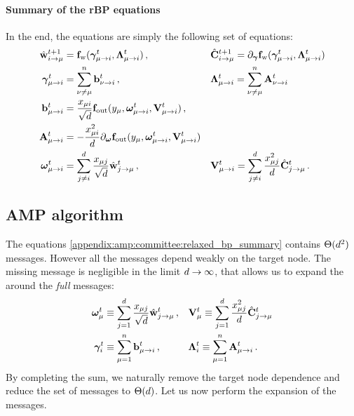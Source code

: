 		\paragraph{Summary of the rBP equations}
			In the end, the  equations are simply the following set of equations:
			\begin{align}
			\label{appendix:amp:committee:relaxed_bp_summary}
			\begin{aligned}
				\hat{{\mathbf{w}}}_{i\to \mu}^{t+1} &= {\mathbf{f}}_{\mathrm{w}}({\boldsymbol{\gamma}}_{\mu \to i}^t,{\boldsymbol{\Lambda}}_{\mu \to i}^t )\,, 
				&&\hat{{\mathbf{C}}}_{i \to \mu}^{t+1} = \partial_{\boldsymbol{\gamma}} {\mathbf{f}}_{\mathrm{w}}({\boldsymbol{\gamma}}_{\mu \to i}^t, {\boldsymbol{\Lambda}}_{\mu \to i}^t)  \\
				{\boldsymbol{\gamma}}_{\mu \to i}^t &=  \sum\limits_{\nu \ne \mu}^n  {\mathbf{b}}_{\nu \to i}^t \,, 
				&& {\boldsymbol{\Lambda}}_{\mu \to i}^t =  \sum\limits_{\nu \ne \mu}^n  {\mathbf{A}}_{\nu \to i}^t   \\
			{\mathbf{b}}_{\mu \to i}^t &=  \frac{x_{\mu i}}{\sqrt{d}} {\mathbf{f}}_{\text{out}} (y_{\mu}, {\boldsymbol{\omega}}_{\mu \to i}^t, {\mathbf{V}}_{\mu \to i}^t) \,, \\ 
			{\mathbf{A}}_{\mu \to i}^t &= - \frac{x_{\mu i}^2}{d}  \partial_{\boldsymbol{\omega}} {\mathbf{f}}_{\text{out}}(y_{\mu}, {\boldsymbol{\omega}}_{\mu \to i}^t, {\mathbf{V}}_{\mu \to i}^t) \\
				{\boldsymbol{\omega}}_{\mu \to i}^t &= \sum\limits_{j\neq i}^d\frac{x_{\mu j}}{\sqrt{d}}   \hat{{\mathbf{w}}}_{j\to \mu}^t\,,
				&& {\mathbf{V}}_{\mu \to i}^t = \sum\limits_{j\neq i}^d\frac{x_{\mu j}^2}{d} \hat{{\mathbf{C}}}_{j\to \mu}^t\,.
			\end{aligned}
			\end{align}
			
\subsection{AMP algorithm}
\label{appendix:amp:derivation:amp_eqs}
	The  equations \eq\eqref{appendix:amp:committee:relaxed_bp_summary} contains $\Theta(d^2)$ messages. However all the messages depend weakly on the target node. The missing message is negligible in the limit $d \to \infty$, that allows us to expand the  around the \emph{full} messages:
			\begin{align}
			\begin{aligned}
				{\boldsymbol{\omega}}_{\mu}^t &\equiv \sum\limits_{j = 1}^d\frac{x_{\mu j}}{\sqrt{d}}   \hat{{\mathbf{w}}}_{j\to \mu}^t\,, 
				&& {\mathbf{V}}_{\mu}^t \equiv \sum\limits_{j=1}^d  \frac{x_{\mu j}^2}{d}  \hat{{\mathbf{C}}}_{j\to \mu}^t \\
				{\boldsymbol{\gamma}}_{i}^t & \equiv  \sum\limits_{\mu =1}^n  {\mathbf{b}}_{\mu \to i}^t \,,
				&& {\boldsymbol{\Lambda}}_{i}^t \equiv  \sum\limits_{\mu =1}^n  {\mathbf{A}}_{\mu \to i}^t \,.
			\end{aligned}		
			\end{align}
			By completing the sum, we naturally remove the target node dependence and reduce the set of messages to $\Theta(d)$. Let us now perform the expansion of the  messages.
	
